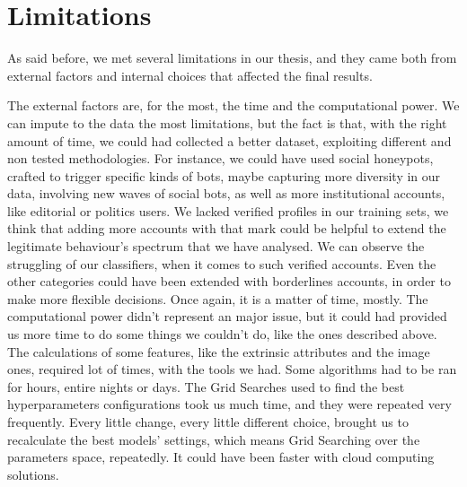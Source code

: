 \section{Limitations}
As said before, we met several limitations in our thesis, and they came both from external factors and internal choices that affected the final results.

The external factors are, for the most, the time and the computational power.
We can impute to the data the most limitations, but the fact is that, with the right amount of time, we could had collected a better dataset, exploiting different and non tested methodologies. For instance, we could have used social honeypots, crafted to trigger specific kinds of bots, maybe capturing more diversity in our data, involving new waves of social bots, as well as more institutional accounts, like editorial or politics users. We lacked verified profiles in our training sets, we think that adding more accounts with that mark could be helpful to extend the legitimate behaviour's spectrum that we have analysed. We can observe the struggling of our classifiers, when it comes to such verified accounts.
Even the other categories could have been extended with borderlines accounts, in order to make more flexible decisions. Once again, it is a matter of time, mostly.
The computational power didn't represent an major issue, but it could had provided us more time to do some things we couldn't do, like the ones described above.
The calculations of some features, like the extrinsic attributes and the image ones, required lot of times, with the tools we had. Some algorithms had to be ran for hours, entire nights or days. The Grid Searches used to find the best hyperparameters configurations took us much time, and they were repeated very frequently. Every little change, every little different choice, brought us to recalculate the best models' settings, which means Grid Searching over the parameters space, repeatedly.
It could have been faster with cloud computing solutions.


